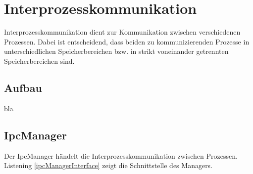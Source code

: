 \section{Interprozesskommunikation}
Interprozesskommunikation dient zur Kommunikation zwischen verschiedenen Prozessen. Dabei ist entscheidend, dass beiden zu kommunizierenden Prozesse in unterschiedlichen Speicherbereichen bzw. in strikt voneinander getrennten Speicherbereichen sind. 

\subsection{Aufbau}
bla

\subsection{IpcManager}
Der IpcManager händelt die Interprozesskommunikation zwischen Prozessen. Listening \ref{ipcManagerInterface} zeigt die Schnittstelle des Managers.



\pagebreak 